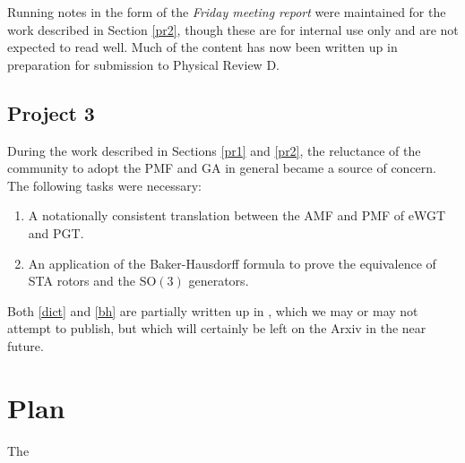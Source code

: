 \documentclass[twoside]{report}
\begin{document}
\begin{multicols}{2}
Running notes in the form of the \textit{Friday meeting report} \cite{fmr} were maintained for the work described in Section \ref{pr2}, though these are for internal use only and are not expected to read well. Much of the content has now been written up \cite{paper-2} in preparation for submission to Physical Review D.
\subsection{Project 3}\label{pr3}
During the work described in Sections \ref{pr1} and \ref{pr2}, the reluctance of the community to adopt the PMF and GA in general became a source of concern. The following tasks were necessary:
\begin{enumerate}[resume]
  \item\label{dict} A notationally consistent translation between the AMF and PMF of eWGT and PGT.
  \item\label{bh} An application of the Baker-Hausdorff formula to prove the equivalence of STA rotors and the $\mathrm{SO}(3)$ generators.
\end{enumerate}
Both \ref{dict} and \ref{bh} are partially written up in \cite{dictionary}, which we may or may not attempt to publish, but which will certainly be left on the Arxiv in the near future.
\section{Plan}\label{plan}
The
\end{multicols}
\begin{multicols}{2}
%


\end{multicols}
\end{document}
